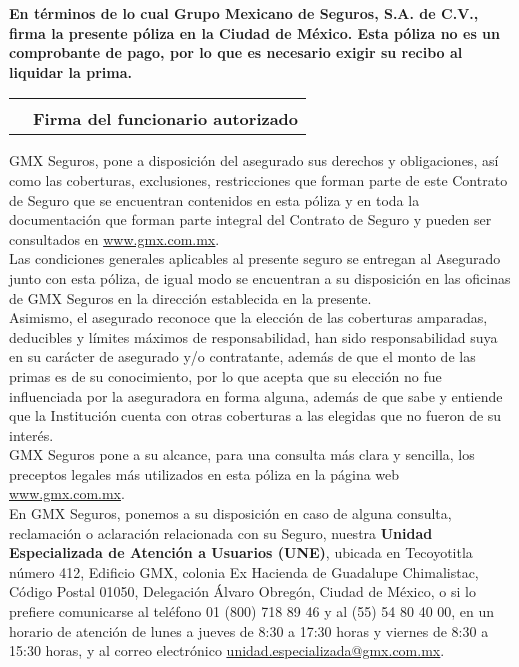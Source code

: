 \documentclass[letterpaper,10pt]{article}
\begin{document}
\textbf{En términos de lo cual Grupo Mexicano de Seguros, S.A. de C.V., firma la presente póliza en la Ciudad de México. Esta póliza no es un comprobante de pago, por lo que es necesario exigir su recibo al liquidar la prima.}

\vspace{1cm}
\begin{center}
    \begin{tabularx}{\textwidth}{Xr}
        &\underline{\hspace{6cm}}\\
        &\textbf{Firma del funcionario autorizado}\\
    \end{tabularx}
\end{center}

\newpage

GMX Seguros, pone a disposición del asegurado sus derechos y obligaciones, así como las coberturas, exclusiones, restricciones que forman parte de este Contrato de Seguro que se encuentran contenidos en esta póliza y en toda la documentación que forman parte integral del Contrato de Seguro y pueden ser consultados en \textcolor{blue}{\underline{\href{www.gmx.com.mx}{www.gmx.com.mx}}}.\\

Las condiciones generales aplicables al presente seguro se entregan al Asegurado junto con esta póliza, de igual modo se encuentran a su disposición en las oficinas de GMX Seguros en la dirección establecida en la presente.\\

Asimismo, el asegurado reconoce que la elección de las coberturas amparadas, deducibles y límites máximos de responsabilidad, han sido responsabilidad suya en su carácter de asegurado y/o contratante, además de que el monto de las primas es de su conocimiento, por lo que acepta que su elección no fue influenciada por la aseguradora en forma alguna, además de que sabe y entiende que la Institución cuenta con otras coberturas a las elegidas que no fueron de su interés.\\

GMX Seguros pone a su alcance, para una consulta más clara y sencilla, los preceptos legales más utilizados en esta póliza en la página web \textcolor{blue}{\underline{\href{www.gmx.com.mx}{www.gmx.com.mx}}}.\\

En GMX Seguros, ponemos a su disposición en caso de alguna consulta, reclamación o aclaración relacionada con su Seguro, nuestra \textbf{Unidad Especializada de Atención a Usuarios (UNE)}, ubicada en Tecoyotitla número 412, Edificio GMX, colonia Ex Hacienda de Guadalupe Chimalistac, Código Postal 01050, Delegación Álvaro Obregón, Ciudad de México, o si lo prefiere comunicarse al teléfono 01 (800) 718 89 46 y al (55) 54 80 40 00, en un horario de atención de lunes a jueves de 8:30 a 17:30 horas y viernes de 8:30 a 15:30 horas, y al correo electrónico \textcolor{blue}{\underline{\href{unidad.especializada@gmx.com.mx}{unidad.especializada@gmx.com.mx}}}.\\
\end{document}
